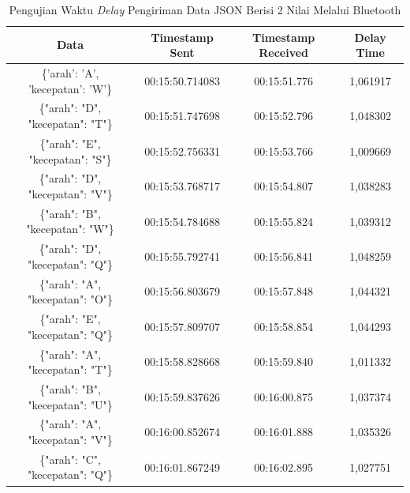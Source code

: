 \begin{table}[htpb]
  \centering
  \caption{Pengujian Waktu \emph{Delay} Pengiriman Data JSON Berisi 2 Nilai Melalui Bluetooth}
  \label{tbl:delayBluetoothJSON2}
  \begin{tabular}{|ccc|c|}
  \hline
  \multicolumn{1}{|c|}{Data}                              & \multicolumn{1}{c|}{Timestamp Sent}  & Timestamp Received & Delay Time  \\ \hline
  \multicolumn{1}{|c|}{\{'arah': 'A', 'kecepatan': 'W'\}} & \multicolumn{1}{c|}{00:15:50.714083} & 00:15:51.776       & 1,061917    \\ \hline
  \multicolumn{1}{|c|}{\{"arah": "D", "kecepatan": "T"\}} & \multicolumn{1}{c|}{00:15:51.747698} & 00:15:52.796       & 1,048302    \\ \hline
  \multicolumn{1}{|c|}{\{"arah": "E", "kecepatan": "S"\}} & \multicolumn{1}{c|}{00:15:52.756331} & 00:15:53.766       & 1,009669    \\ \hline
  \multicolumn{1}{|c|}{\{"arah": "D", "kecepatan": "V"\}} & \multicolumn{1}{c|}{00:15:53.768717} & 00:15:54.807       & 1,038283    \\ \hline
  \multicolumn{1}{|c|}{\{"arah": "B", "kecepatan": "W"\}} & \multicolumn{1}{c|}{00:15:54.784688} & 00:15:55.824       & 1,039312    \\ \hline
  \multicolumn{1}{|c|}{\{"arah": "D", "kecepatan": "Q"\}} & \multicolumn{1}{c|}{00:15:55.792741} & 00:15:56.841       & 1,048259    \\ \hline
  \multicolumn{1}{|c|}{\{"arah": "A", "kecepatan": "O"\}} & \multicolumn{1}{c|}{00:15:56.803679} & 00:15:57.848       & 1,044321    \\ \hline
  \multicolumn{1}{|c|}{\{"arah": "E", "kecepatan": "Q"\}} & \multicolumn{1}{c|}{00:15:57.809707} & 00:15:58.854       & 1,044293    \\ \hline
  \multicolumn{1}{|c|}{\{"arah": "A", "kecepatan": "T"\}} & \multicolumn{1}{c|}{00:15:58.828668} & 00:15:59.840       & 1,011332    \\ \hline
  \multicolumn{1}{|c|}{\{"arah": "B", "kecepatan": "U"\}} & \multicolumn{1}{c|}{00:15:59.837626} & 00:16:00.875       & 1,037374    \\ \hline
  \multicolumn{1}{|c|}{\{"arah": "A", "kecepatan": "V"\}} & \multicolumn{1}{c|}{00:16:00.852674} & 00:16:01.888       & 1,035326    \\ \hline
  \multicolumn{1}{|c|}{\{"arah": "C", "kecepatan": "Q"\}} & \multicolumn{1}{c|}{00:16:01.867249} & 00:16:02.895       & 1,027751    \\ \hline

\end{tabular}
\end{table}
